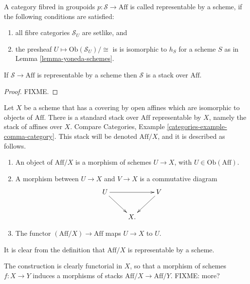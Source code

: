 \begin{definition}
\label{definition-representable-by-scheme}
A category fibred in groupoids $p : \mathcal{S} \to \text{Aff}$ is
called representable by a scheme, if the following conditions are satisfied:
\begin{enumerate}
\item all fibre categories $\mathcal{S}_U$ are setlike, and
\item the presheaf $U \mapsto \text{Ob}(\mathcal{S}_U)/\cong$ is 
is isomorphic to $h_S$ for a scheme $S$ as in
Lemma \ref{lemma-yoneda-schemes}.
\end{enumerate}
\end{definition}

\begin{lemma}
\label{lemma-representable-by-scheme-implies-stack}
If $\mathcal{S} \to \text{Aff}$ is representable by a scheme then $\mathcal{S}$
is a stack over $\text{Aff}$.
\end{lemma}

\begin{proof}
FIXME.
\end{proof}

\begin{example}
\label{example-standard-representable-scheme}
Let $X$ be a scheme that has a covering by open affines which are isomorphic
to objects of $\text{Aff}$. There is a standard stack over $\text{Aff}$
representable by $X$, namely the stack of affines over $X$. Compare
Categories, Example \ref {categories-example-comma-category}.
This stack will be denoted $\text{Aff}/X$, and it is described as follows.
\begin{enumerate}
\item An object of $\text{Aff}/X$ is a morphism of schemes
$U \to X$, with $U \in \text{Ob}(\text{Aff})$.
\item A morphism between $U\to X$ and $V \to X$ is a commutative diagram
$$
\xymatrix{
U \ar[rr] \ar[rd] && V \ar[ld] \\
&X.&}
$$
\item The functor $(\text{Aff}/X) \to \text{Aff}$ maps $U\to X$ to $U$.
\end{enumerate}
It is clear from the definition that $\text{Aff}/X$ is representable by
a scheme. 

\medskip\noindent
The construction is clearly functorial in $X$, so that a morphism
of schemes $f : X \to Y$ induces a morphisms of stacks 
$\text{Aff}/X \to \text{Aff}/Y$. FIXME: more?
\end{example}

